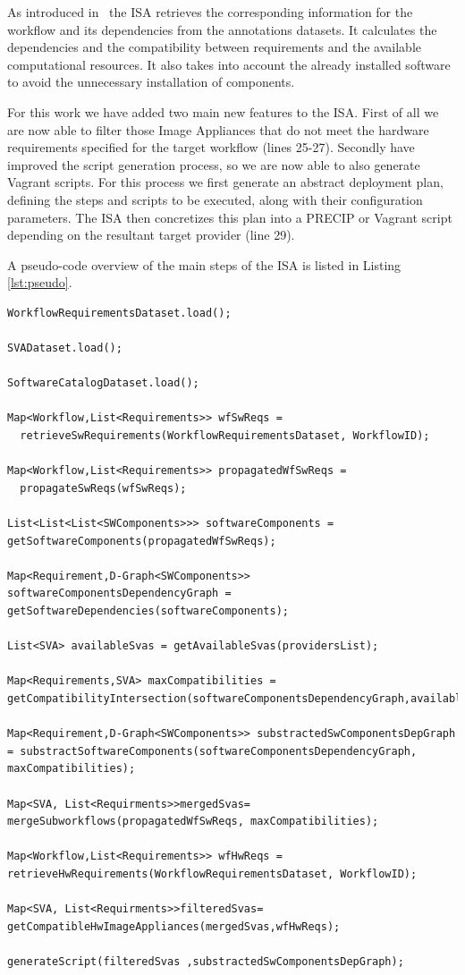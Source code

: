 As introduced in~\cite{wicus} the ISA retrieves the corresponding information for the workflow and its dependencies from the annotations datasets. It calculates the dependencies and the compatibility between requirements and the available computational resources. It also takes into account the already installed software to avoid the unnecessary installation of components.

For this work we have added two main new features to the ISA. First of all we are now able to filter those Image Appliances that do not meet the hardware requirements specified for the target workflow (lines 25-27). Secondly have improved the script generation process, so we are now able to also generate Vagrant scripts. For this process we first generate an abstract deployment plan, defining the steps and scripts to be executed, along with their configuration parameters. The ISA then concretizes this plan into a PRECIP or Vagrant script depending on the resultant target provider (line 29).

A pseudo-code overview of the main steps of the ISA is listed in Listing \ref{lst:pseudo}.

          
\begin{lstlisting}[caption={Pseudo-code overview of the ISA},label={lst:pseudo}]
WorkflowRequirementsDataset.load();

SVADataset.load();

SoftwareCatalogDataset.load();

Map<Workflow,List<Requirements>> wfSwReqs = 
  retrieveSwRequirements(WorkflowRequirementsDataset, WorkflowID);

Map<Workflow,List<Requirements>> propagatedWfSwReqs = 
  propagateSwReqs(wfSwReqs);

List<List<List<SWComponents>>> softwareComponents = getSoftwareComponents(propagatedWfSwReqs);

Map<Requirement,D-Graph<SWComponents>> softwareComponentsDependencyGraph = getSoftwareDependencies(softwareComponents);

List<SVA> availableSvas = getAvailableSvas(providersList);

Map<Requirements,SVA> maxCompatibilities = getCompatibilityIntersection(softwareComponentsDependencyGraph,availableSvas);

Map<Requirement,D-Graph<SWComponents>> substractedSwComponentsDepGraph = substractSoftwareComponents(softwareComponentsDependencyGraph, maxCompatibilities);

Map<SVA, List<Requirments>>mergedSvas= mergeSubworkflows(propagatedWfSwReqs, maxCompatibilities);

Map<Workflow,List<Requirements>> wfHwReqs =   retrieveHwRequirements(WorkflowRequirementsDataset, WorkflowID);

Map<SVA, List<Requirments>>filteredSvas= getCompatibleHwImageAppliances(mergedSvas,wfHwReqs);

generateScript(filteredSvas ,substractedSwComponentsDepGraph);

\end{lstlisting}



